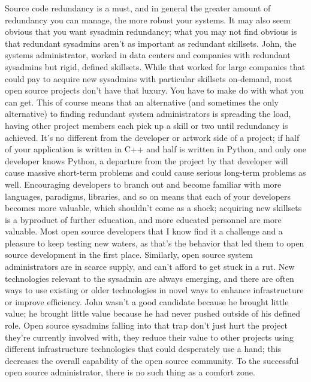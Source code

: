 Source code redundancy is a must, and in general the greater amount of
redundancy you can manage, the more robust your systems. It may also seem
obvious that you want sysadmin redundancy; what you may not find obvious is that
redundant sysadmins aren’t as important as redundant skillsets. John, the
systems administrator, worked in data centers and companies with redundant
sysadmins but rigid, defined skillsets. While that worked for large companies
that could pay to acquire new sysadmins with particular skillsets on-demand,
most open source projects don’t have that luxury. You have to make do with what
you can get. This of course means that an alternative (and sometimes the only
alternative) to finding redundant system administrators is spreading the load,
having other project members each pick up a skill or two until redundancy is
achieved.
It’s no different from the developer or artwork side of a project; if half of
your application is written in C++ and half is written in Python, and only one
developer knows Python, a departure from the project by that developer will
cause massive short-term problems and could cause serious long-term problems as
well. Encouraging developers to branch out and become familiar with more
languages, paradigms, libraries, and so on means that each of your developers
becomes more valuable, which shouldn’t come as a shock; acquiring new skillsets
is a byproduct of further education, and more educated personnel are more
valuable.
Most open source developers that I know find it a challenge and a pleasure to
keep testing new waters, as that’s the behavior that led them to open source
development in the first place. Similarly, open source system administrators are
in scarce supply, and can’t afford to get stuck in a rut. New technologies
relevant to the sysadmin are always emerging, and there are often ways to use
existing or older technologies in novel ways to enhance infrastructure or
improve efficiency.
John wasn’t a good candidate because he brought little value; he brought little
value because he had never pushed outside of his defined role. Open source
sysadmins falling into that trap don’t just hurt the project they’re currently
involved with, they reduce their value to other projects using different
infrastructure technologies that could desperately use a hand; this decreases
the overall capability of the open source community. To the successful open
source administrator, there is no such thing as a comfort zone.
 
